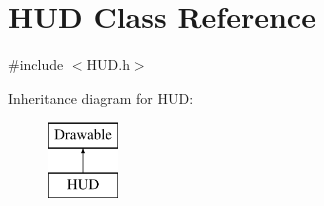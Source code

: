 \hypertarget{class_h_u_d}{}\section{H\+U\+D Class Reference}
\label{class_h_u_d}


{\ttfamily \#include $<$H\+U\+D.\+h$>$}

Inheritance diagram for H\+U\+D\+:\begin{figure}[H]
\begin{center}
\leavevmode
\includegraphics[height=2.000000cm]{class_h_u_d}
\end{center}
\end{figure}
